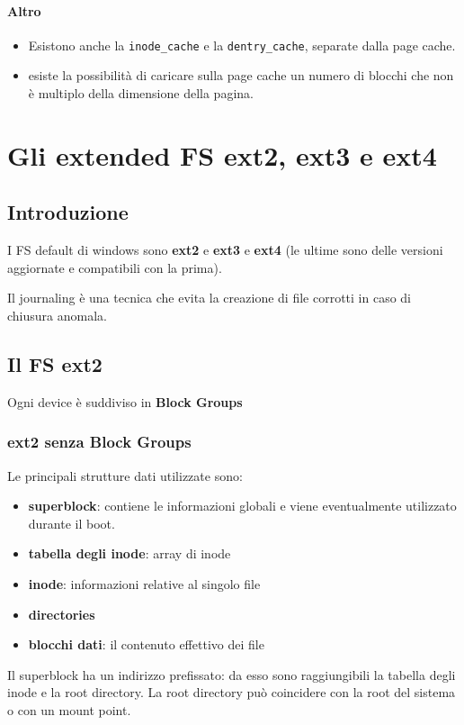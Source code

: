 \documentclass[12pt, a4paper]{report}
\begin{document}
\subsubsection{Altro}
\begin{itemize}
	\item Esistono anche la \texttt{inode\_cache} e la \texttt{dentry\_cache},
		separate dalla page cache.
	\item esiste la possibilità di caricare sulla page cache un numero di
		blocchi che non è multiplo della dimensione della pagina.
\end{itemize}

\chapter{Gli extended FS ext2, ext3 e ext4}
\section{Introduzione}
I FS default di windows sono \textbf{ext2} e \textbf{ext3} e \textbf{ext4} (le
ultime sono delle versioni aggiornate e compatibili con la prima).

Il journaling è una tecnica che evita la creazione di file corrotti in caso di
chiusura anomala.
\section{Il FS ext2}
Ogni device è suddiviso in \textbf{Block Groups}

\subsection{ext2 senza Block Groups}
Le principali strutture dati utilizzate sono:
\begin{itemize}
	\item \textbf{superblock}: contiene le informazioni globali e viene
		eventualmente utilizzato durante il boot.
	\item \textbf{tabella degli inode}: array di inode
	\item \textbf{inode}: informazioni relative al singolo file
	\item \textbf{directories}
	\item \textbf{blocchi dati}: il contenuto effettivo dei file
\end{itemize}
Il superblock ha un indirizzo prefissato: da esso sono raggiungibili la tabella
degli inode e la root directory. La root directory può coincidere con la root
del sistema o con un mount point.
\end{document}

